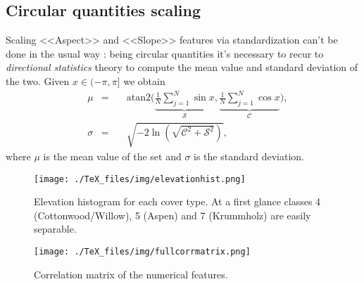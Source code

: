 \subsection{Circular quantities scaling}
Scaling <<Aspect>> and <<Slope>> features via standardization can't be done in the usual way \cite{wiki:directionalstats}: being circular quantities it's necessary to recur to \textit{directional statistics} theory to compute the mean value and standard deviation of the two. Given $x\in(-\pi,\pi]$ we obtain
\begin{equation}
\begin{aligned}
&\mu&=&\quad\text{atan2}\Bigg(\underbrace{\frac{1}{N}\sum_{j=1}^{N}\sin{x}}_{\mathcal{S}},\underbrace{\frac{1}{N}\sum_{j=1}^{N}\cos{x}}_{\mathcal{C}}\Bigg) \text{,} \\
&\sigma&=&\quad\sqrt{-2\ln\left(\sqrt{\mathcal{C}^2+\mathcal{S}^2}\right)}\text{,}
\end{aligned}
\end{equation}   
where $\mu$ is the mean value of the set and $\sigma$ is the standard deviation.
\begin{figure}
\centering
\texttt{[image: ./TeX\_files/img/elevationhist.png]}
\caption{Elevation histogram for each cover type. At a first glance classes 4 (Cottonwood/Willow), 5 (Aspen) and 7 (Krummholz) are easily separable.}
\label{fig:elevationhist}
\end{figure}
\begin{sidewaysfigure}
\centering
\texttt{[image: ./TeX\_files/img/fullcorrmatrix.png]}
\caption{Correlation matrix of the numerical features.}
\label{fig:fullcorrmatrix}
\end{sidewaysfigure}